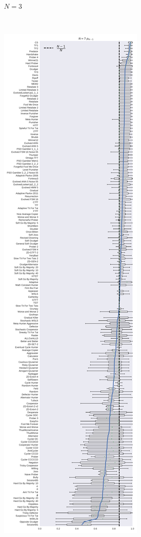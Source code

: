 \documentclass[10pt,journal]{IEEEtran}
\begin{document}
\begin{figure}[!hbtp]
\begin{subfigure}{.3\columnwidth}
        \caption{\(N=3\)}
        \label{fig:boxplot_3_resist}
    \end{subfigure}%
    ~
    \begin{subfigure}{.3\columnwidth}
        \centering
        \includegraphics[width=\columnwidth]{img/boxplot_7_resist.pdf}

\end{subfigure}
\end{figure}
\end{document}
